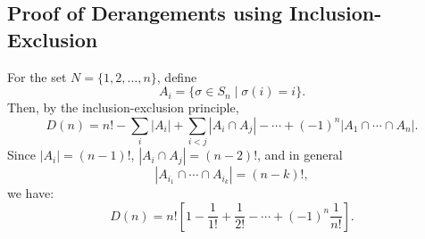 \documentclass{article}
\begin{document}
\subsection*{Proof of Derangements using Inclusion-Exclusion}
For the set $N=\{1,2,\ldots,n\}$, define
\[
A_i = \{\sigma \in S_n \mid \sigma(i) = i\}.
\]
Then, by the inclusion-exclusion principle,
\[
D(n) = n! - \sum_{i} |A_i| + \sum_{i<j} |A_i \cap A_j| - \cdots + (-1)^n |A_1 \cap \cdots \cap A_n|.
\]
Since $|A_i| = (n-1)!$, $|A_i \cap A_j| = (n-2)!$, and in general
\[
|A_{i_1} \cap \cdots \cap A_{i_k}| = (n-k)!,
\]
we have:
\[
D(n) = n! \left[ 1 - \frac{1}{1!} + \frac{1}{2!} - \cdots + (-1)^n \frac{1}{n!} \right].
\]
\end{document}
